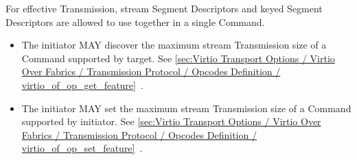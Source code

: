 For effective Transmission, stream Segment Descriptors and keyed Segment Descriptors are allowed to use together in a single Command.

\begin{itemize}
\item The initiator MAY discover the maximum stream Transmission size of a Command supported by target. See \ref{sec:Virtio Transport Options / Virtio Over Fabrics / Transmission Protocol / Opcodes Definition / virtio_of_op_get_feature}~.
\item The initiator MAY set the maximum stream Transmission size of a Command supported by initiator. See \ref{sec:Virtio Transport Options / Virtio Over Fabrics / Transmission Protocol / Opcodes Definition / virtio_of_op_set_feature}~.
\end{itemize}

